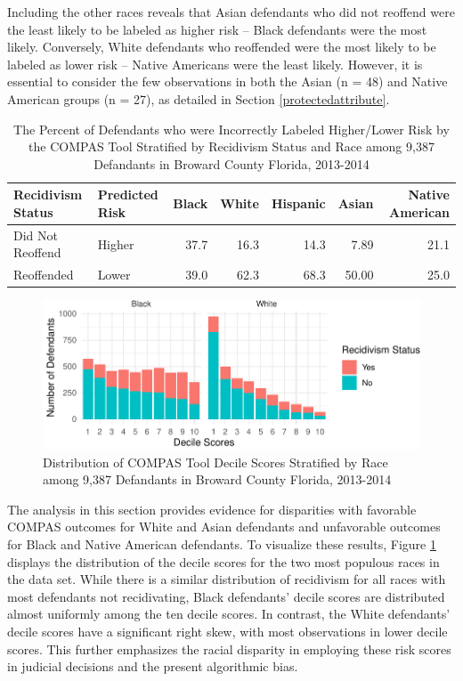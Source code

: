 \documentclass[12pt, twoside]{amherstthesis}
\begin{document}
Including the other races reveals that Asian defendants who did not reoffend were the least likely to be labeled as higher risk -- Black defendants were the most likely. Conversely, White defendants who reoffended were the most likely to be labeled as lower risk -- Native Americans were the least likely. However, it is essential to consider the few observations in both the Asian (n = 48) and Native American groups (n = 27), as detailed in Section \ref{protectedattribute}.
\begin{table}

\caption{\label{tab:ch3table2}The Percent of Defendants who were Incorrectly Labeled Higher/Lower Risk by the COMPAS Tool Stratified by Recidivism Status and Race among 9,387 Defandants in Broward County Florida, 2013-2014}
\centering
\begin{tabular}[t]{llrrrrr}
\toprule
Recidivism Status & Predicted Risk & Black & White & Hispanic & Asian & Native American\\
\midrule
Did Not Reoffend & Higher & 37.7 & 16.3 & 14.3 & 7.89 & 21.1\\
Reoffended & Lower & 39.0 & 62.3 & 68.3 & 50.00 & 25.0\\
\bottomrule
\end{tabular}
\end{table}
\begin{figure}

{\centering \includegraphics{Dasha-Asienga_StatThesis_files/figure-latex/ch3fig11-1} 

}

\caption{Distribution of COMPAS Tool Decile Scores Stratified by Race among 9,387 Defandants in Broward County Florida, 2013-2014}\label{fig:ch3fig11}
\end{figure}
The analysis in this section provides evidence for disparities with favorable COMPAS outcomes for White and Asian defendants and unfavorable outcomes for Black and Native American defendants. To visualize these results, Figure \ref{fig:ch3fig11} displays the distribution of the decile scores for the two most populous races in the data set. While there is a similar distribution of recidivism for all races with most defendants not recidivating, Black defendants' decile scores are distributed almost uniformly among the ten decile scores. In contrast, the White defendants' decile scores have a significant right skew, with most observations in lower decile scores. This further emphasizes the racial disparity in employing these risk scores in judicial decisions and the present algorithmic bias.
\end{document}
